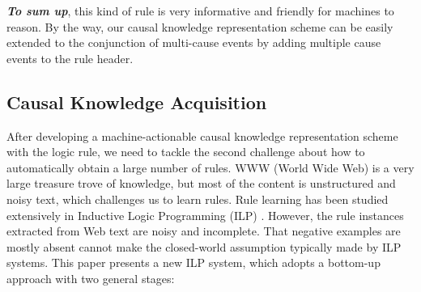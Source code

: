 \textbf{\textit{To sum up}}, this kind of rule is very informative and friendly for machines to reason.
By the way, our causal knowledge representation scheme can be easily extended to the conjunction of multi-cause events by adding multiple cause events to the rule header. 



	
	
	
\subsection{Causal Knowledge Acquisition}
\label{intro:Causal_Knowledge_Mining}
After developing a machine-actionable causal knowledge representation scheme with the logic rule, we need to tackle the second challenge about how to automatically obtain a large number of rules.  
WWW (World Wide Web) is a very large treasure trove of knowledge, but most of the content is unstructured and noisy text, which challenges us to learn rules.
Rule learning has been studied extensively in Inductive Logic Programming (ILP) \cite{Quinlan1990,Muggleton1997}. However, the rule instances extracted from Web text are noisy and incomplete. That negative examples are mostly absent cannot make the closed-world assumption typically made by ILP systems. This paper presents a new ILP system, which adopts a bottom-up approach with two general stages:	

